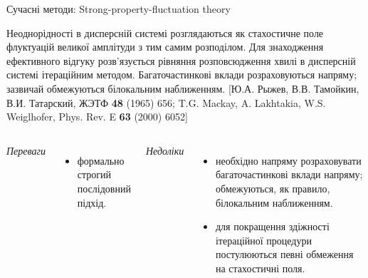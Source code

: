 \documentclass[10pt]{beamer}
\begin{document}
\begin{frame}{Сучасні методи: Strong-property-fluctuation theory}

\footnotesize
    Неоднорідності в дисперсній системі розглядаються як стахостичне поле флуктуацій великої амплітуди з тим самим розподілом. Для знаходження ефективного відгуку розв'язується рівняння розповсюдження хвилі в дисперсній системі ітераційним методом. Багаточастинкові вклади розраховуються напряму; зазвичай обмежуються білокальним наближенням.
    [Ю.А. Рыжев, В.В. Тамойкин, В.И. Татарский, ЖЭТФ \textbf{48} (1965) 656; T.G. Mackay, A. Lakhtakia, W.S. Weiglhofer, Phys. Rev. E {\bf 63} (2000) 6052]
    \vspace{-5pt}
    \begin{columns}[T,onlytextwidth]
          \begin{center}
          {\it Переваги}
          \end{center}
          \vspace{-10pt}
          \begin{itemize}
              \item формально строгий послідовний підхід.
          \end{itemize}
    
          \begin{center}
          {\it Недоліки}
          \end{center}
          \vspace{-10pt}
          \begin{itemize}
              \item необхідно напряму розраховувати багаточастинкові вклади напряму; обмежуються, як правило, білокальним наближенням.
              \item для покращення здіжності ітераційної процедури постулюються певні обмеження на стахостичні поля.
          \end{itemize}
    \end{columns}

\end{frame}
\end{document}
